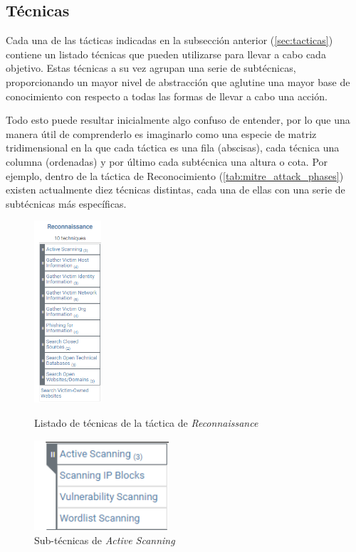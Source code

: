 \subsection{Técnicas} \label{sec:técnicas}

Cada una de las tácticas indicadas en la subsección anterior (\ref{sec:tacticas}) contiene un listado técnicas que pueden utilizarse para llevar a cabo cada objetivo. Estas técnicas a su vez agrupan una serie de subtécnicas, proporcionando un mayor nivel de abstracción que aglutine una mayor base de conocimiento con respecto a todas las formas de llevar a cabo una acción. 

Todo esto puede resultar inicialmente algo confuso de entender, por lo que una manera útil de comprenderlo es imaginarlo como una especie de matriz tridimensional en la que cada táctica es una fila (abscisas), cada técnica una columna (ordenadas) y por último cada subtécnica una altura o cota. Por ejemplo, dentro de la táctica de Reconocimiento (\ref{tab:mitre_attack_phases}) existen actualmente diez técnicas distintas, cada una de ellas con una serie de subtécnicas más específicas.

\begin{figure}[H]
    \centering
    \begin{minipage}[b]{0.45\textwidth}
        \centering
        \includegraphics[width=25mm]{imagenes/techniques.png}
        \caption{Listado de técnicas de la táctica de \textit{Reconnaissance} \cite{mitre_attack}}
        \label{fig:reconnaissance-techniques}
    \end{minipage}
    \hspace{0.05\textwidth} %
    \begin{minipage}[b]{0.45\textwidth}
        \centering
        \includegraphics[width=5cm]{imagenes/active-scanning.png}
        \caption{Sub-técnicas de \textit{Active Scanning} \cite{mitre_attack}}
        \label{fig:active-scanning}
    \end{minipage}
\end{figure}


